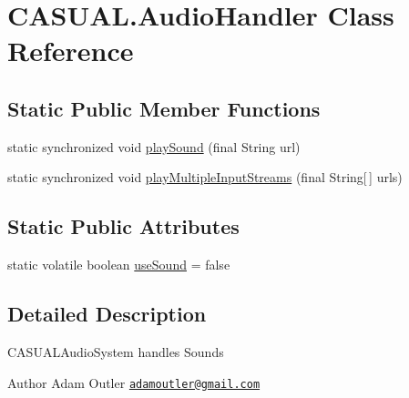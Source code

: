 \hypertarget{class_c_a_s_u_a_l_1_1_audio_handler}{\section{C\-A\-S\-U\-A\-L.\-Audio\-Handler Class Reference}
\label{class_c_a_s_u_a_l_1_1_audio_handler}
}
\subsection*{Static Public Member Functions}
\begin{DoxyCompactItemize}
\item 
static synchronized void \hyperlink{class_c_a_s_u_a_l_1_1_audio_handler_af1e12ec8d0d6d7923526b5f416c5a83c}{play\-Sound} (final String url)
\item 
static synchronized void \hyperlink{class_c_a_s_u_a_l_1_1_audio_handler_a0e6ee4a1477a8d6c0365864c3d71782b}{play\-Multiple\-Input\-Streams} (final String\mbox{[}$\,$\mbox{]} urls)
\end{DoxyCompactItemize}
\subsection*{Static Public Attributes}
\begin{DoxyCompactItemize}
\item 
static volatile boolean \hyperlink{class_c_a_s_u_a_l_1_1_audio_handler_ad7986b266c595310fa3ad7167d690594}{use\-Sound} = false
\end{DoxyCompactItemize}


\subsection{Detailed Description}
C\-A\-S\-U\-A\-L\-Audio\-System handles Sounds

\begin{DoxyAuthor}{Author}
Adam Outler \href{mailto:adamoutler@gmail.com}{\tt adamoutler@gmail.\-com} 
\end{DoxyAuthor}


